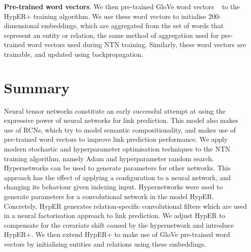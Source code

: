 \noindent \textbf{Pre-trained word vectors}. We then pre-trained GloVe word vectors \unskip ~\citep{pennington2014glove} to the HypER+ training algorithm. We use these word vectors to initialise  200-dimensional embeddings, which are aggregated from the set of words that represent an entity or relation, the same method of aggregation used for pre-trained word vectors used during NTN training. Similarly, these word vectors are trainable, and updated using backpropagation.  



\section{Summary}

Neural tensor networks constitute an early successful attempt at using the expressive power of neural networks for link prediction. This model also makes use of RCNs, which try to model semantic compositionality, and makes use of pre-trained word vectors to improve link prediction performance. We apply modern stochastic and hyperparameter optimisation techniques to the NTN training algorithm, namely Adam and hyperparameter random search. \newline
Hypernetworks can be used to generate parameters for other networks. This approach has the effect of applying a configuration to a neural network, and changing its behaviour given indexing input. Hypernetworks were used to generate parameters for a convolutional network in the model HypER. Concretely, HypER generates relation-specific convolutional filters which are used in a neural factorisation approach to link prediction. We adjust HypER to compensate for the covariate shift caused by the hypernetwork and introduce HypER+. We then extend HypER+ to make use of GloVe pre-trained word vectors by initialising entities and relations using these embeddings. \newline
